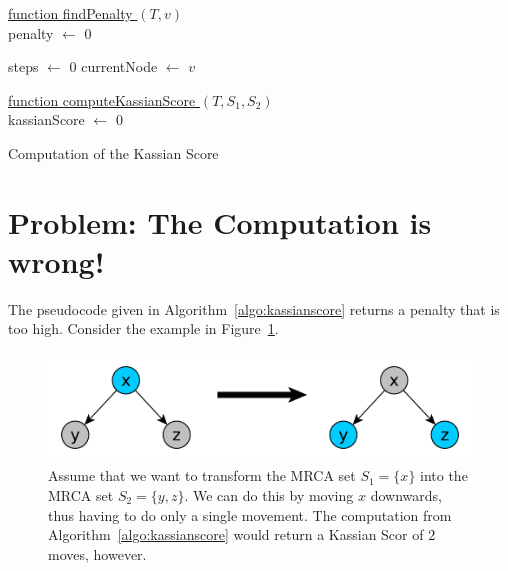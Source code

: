 \documentclass{llncs}
\begin{document}
\begin{algorithm}


\underline{function findPenalty $(T, v)$}\\
penalty $\gets$ $0$\;

steps $\gets$ $0$\;
currentNode $\gets$ $v$\;
\;


\underline{function computeKassianScore $(T, S_1, S_2)$}\\

kassianScore $\gets$ $0$\;




\caption{Computation of the Kassian Score}
\label{algo:kassianscore}
\end{algorithm}

\section{Problem: The Computation is wrong!}
The pseudocode given in Algorithm~\ref{algo:kassianscore} returns a penalty that is too high. Consider the example in Figure~\ref{fig:problem}.

\begin{figure}[H!]
\centering
\includegraphics[scale=0.5]{images/problem_with_kassian_score.pdf}
\caption{Assume that we want to transform the MRCA set $S_1 = \{x\}$ into the MRCA set $S_2 = \{y,z\}$. We can do this by moving $x$ downwards, thus having to do only a single movement. The computation from Algorithm~\ref{algo:kassianscore} would return a Kassian Scor of $2$ moves, however.}
\label{fig:problem}
\end{figure}



\end{document}
